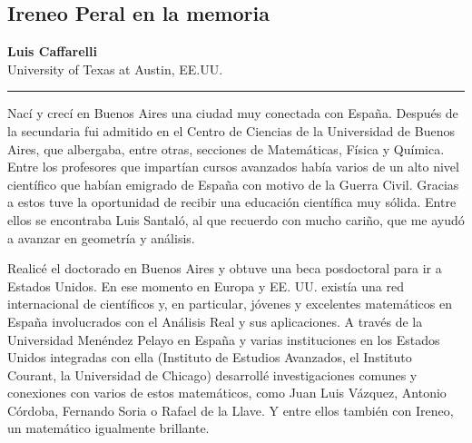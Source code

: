%
%
%
%

\subsection{Ireneo Peral en la memoria}

\begin{center}\large
\textbf{Luis Caffarelli}\\[1em] 
University of Texas at Austin, EE.UU.\\
{\color{azulsema}\rule{.5\linewidth}{1pt}}
\end{center}

\vskip 5mm


Nac\'i y crec\'i en Buenos Aires una ciudad muy conectada con Espa\~na.
Despu\'es de la secundaria fui admitido en el Centro de Ciencias de la Universidad de Buenos Aires,  que albergaba, entre otras, secciones de Matem\'aticas, F\'isica y Qu\'imica. Entre los profesores que impart\'ian cursos avanzados hab\'ia varios de un alto nivel cient\'ifico que hab\'ian emigrado de Espa\~na con motivo de la Guerra Civil.
Gracias a estos tuve la oportunidad de recibir una educaci\'on cient\'ifica muy s\'olida. 
Entre ellos se encontraba Luis Santal\'o, al que recuerdo con mucho cari\~no, que me ayud\'o a avanzar en geometr\'ia y an\'alisis. 



Realic\'e el doctorado en Buenos Aires y obtuve una beca posdoctoral para ir a Estados Unidos.
En ese momento en Europa y EE. UU. exist\'ia una red internacional de cient\'ificos y, en particular, j\'ovenes y excelentes matem\'aticos en Espa\~na involucrados con el An\'alisis Real y sus aplicaciones.
A trav\'es de la Universidad Men\'endez Pelayo en Espa\~na y varias instituciones en los Estados Unidos integradas con ella (Instituto de Estudios Avanzados, el Instituto Courant, la Universidad de Chicago) desarroll\'e investigaciones comunes y conexiones con varios de estos matem\'aticos,  como Juan Luis V\'azquez, Antonio C\'ordoba, Fernando Soria o Rafael de la Llave.
Y entre ellos tambi\'en  con Ireneo, un matem\'atico igualmente brillante.



